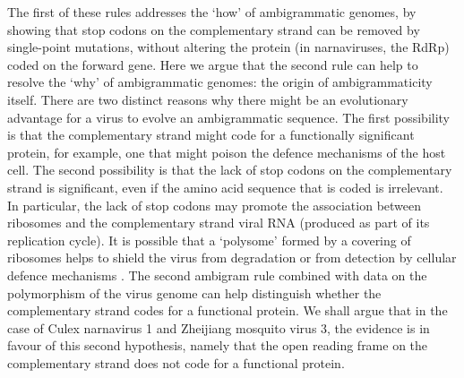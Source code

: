 \documentclass[unnumsec,webpdf,contemporary,large,namedate]{oup-authoring-template}%
\theoremstyle{thmstyleone}%
\theoremstyle{thmstyletwo}%
\theoremstyle{thmstylethree}%
\begin{document}
The first of these rules addresses the \lq how' of  ambigrammatic genomes, by showing that 
stop codons on the complementary strand can be removed by single-point mutations, without 
altering the protein (in narnaviruses, the RdRp) coded on the forward gene. Here we argue that the 
second rule can help to resolve the \lq why' of ambigrammatic genomes: 
the origin of ambigrammaticity itself. There are two 
distinct reasons why there might be an evolutionary advantage for a virus to evolve an 
ambigrammatic sequence. The first possibility is that the complementary strand might code 
for a functionally significant protein, for example, one that might poison the defence mechanisms 
of the host cell. The second possibility is that the lack of stop codons on the complementary strand 
is significant, even if the amino acid sequence that is coded is irrelevant. In particular, the lack of stop codons 
may promote the association between ribosomes and the complementary strand viral RNA (produced as part of its 
replication cycle). It is possible that a \lq polysome' formed by a covering of ribosomes helps to shield 
the virus from degradation or from detection by cellular defence mechanisms \cite{Cep20,Ret+20,Wil+21}.
The second ambigram rule combined with data on the polymorphism of the 
virus genome can help distinguish whether the complementary strand codes for a functional protein. 
We shall argue that in the case of Culex narnavirus 1 and Zheijiang mosquito virus 3, the evidence 
is in favour of this second hypothesis, namely that the open reading frame on the complementary strand does 
not code for a functional protein.
\end{document}
